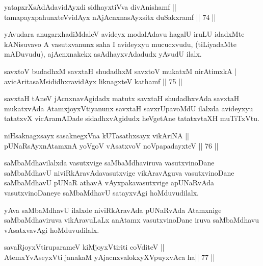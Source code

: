 
\begin{shl}
yatapxrXsAdAdavidAyxdi sidhayxtiVva divAnishamf ||  \\
tamapayxpahunxteV\s vidAyx nAjAcnxnasAyxsitx duSakxramf \hfill||  74 ||  
\end{shl}

\begin{artha}
yAvudara anugarxhadiMdaleV avideyx modalAdavu hagalU iruLU idadxMte kANisuvavo A vasutxvanunx saha I avideyxyu mucucxvudu, (tiLiyadaMte mADuvudu), ajAcnxnakekx asAdhayxvAdadudx yAvudU ilalx.
\end{artha}

\begin{shl}
savxtoV budadhxM savxtaH shudadhxM savxtoV mukatxM nirAtimxkA | \\
avicAritasaMsididhxravidAyx liknagxteV kathamf \hfill||  75 ||  
\end{shl}

\begin{artha}
savxtaH tAneV jAcnxnavAgidadx matutx savxtaH shudadhxvAda savxtaH mukatxvAda AtamxjoyxVtiyanunx savxtaH savxrUpavoMdU ilalxda avideyxyu tatatxvX vicAramADade sidadhxvAgidudx heVgetAne tatatxvtaXH muTiTxVtu.
\end{artha}

\begin{shl}
niHsaknagxsayx sasaknegxVna kUTasathxsayx vikAriNA ||  \\
pUNaRsAyxnAtamxnA yoVgoV vAsatxvoV noVpapadayxteV \hfill||  76 ||  
\end{shl}

\begin{artha}
saMbaMdhavilalxda vasutxvige saMbaMdhaviruva vasutxvinoDane saMbaMdhavU niviRkAravAdavasutxvige vikAravAguva vasutxvinoDane saMbaMdhavU pUNaR athavA vAyxpakavasutxvige apUNaRvAda vasutxvinoDaneye saMbaMdhavU satayxvAgi hoMduvudilalx.

yAva saMbaMdhavU ilalxde niviRkAravAda pUNaRvAda Atamxnige saMbaMdhaviruva vikAravuLaLx anAtamx vasutxvinoDane iruva saMbaMdhavu vAsatxvavAgi hoMduvudilalx.
\end{artha}

\begin{shl}
savaRjoyxVtiruparameV kiMjoyxVtiriti coVditeV ||  \\
AtemxYvAseyxVti janakaM yAjacnxvalokxyXV\s puyxvAca ha\hfill ||  77 ||  
\end{shl}

